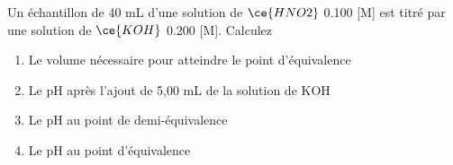 \documentclass[
  11pt,
  a4paper,
  openany]{book}
\providecommand{\tightlist}{%
  \setlength{\itemsep}{0pt}\setlength{\parskip}{0pt}}
\begin{document}
\clearpage

\begin{Exercise}

Un échantillon de 40 mL d'une solution de \(\ce{HNO2}\) 0.100 {[}M{]} est titré par une solution de \(\ce{KOH}\) 0.200 {[}M{]}. Calculez

\begin{enumerate}
\def\labelenumi{\alph{enumi}.}
\tightlist
\item
  Le volume nécessaire pour atteindre le point d'équivalence
\item
  Le pH après l'ajout de 5,00 mL de la solution de KOH
\item
  Le pH au point de demi-équivalence
\item
  Le pH au point d'équivalence
\end{enumerate}

\end{Exercise}
\end{document}

